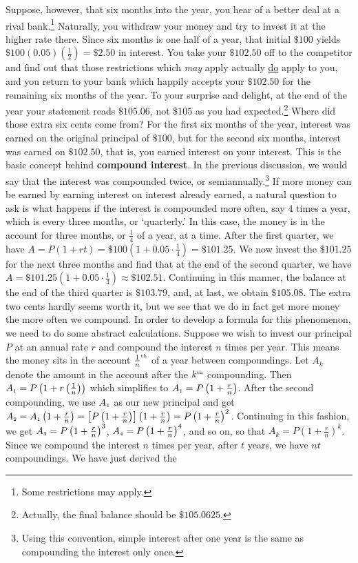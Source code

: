 Suppose, however, that six months into the year, you hear of a better deal at a rival bank.\footnote{Some restrictions may apply.} Naturally, you withdraw your money and try to invest it at the higher rate there.  Since six months is one half of a year, that initial $\$100$ yields $\$100(0.05)\left(\frac{1}{2}\right) = \$ 2.50$ in interest.  You take your $\$102.50$ off to the competitor and find out that those restrictions which \textit{may} apply actually \underline{do} apply to you, and you return to your bank which happily accepts your $\$102.50$ for the remaining six months of the year.  To your surprise and delight, at the end of the year your statement reads $\$105.06$, not $\$105$ as you had expected.\footnote{Actually, the final balance should be $\$105.0625$.}  Where did those extra six cents come from?  For the first six months of the year, interest was earned on the original principal of $\$100$, but for the second six months, interest was earned on $\$102.50$, that is, you earned interest on your interest.  This is the basic concept behind \textbf{compound interest}.  In the previous discussion, we would say that the interest was compounded twice, or semiannually.\footnote{Using this convention, simple interest after one year is the same as compounding the interest only once.}  If more money can be earned by earning interest on interest already earned, a natural question to ask is what happens if the interest is compounded more often, say $4$ times a year, which is every three months, or `quarterly.'  In this case, the money is in the account for three months, or $\frac{1}{4}$ of a year, at a time.  After the first quarter, we have $A = P(1+rt) =  \$100 \left(1 + 0.05 \cdot \frac{1}{4} \right) = \$101.25$.  We now invest the $\$101.25$ for the next three months and find that at the end of the second quarter, we have $A =  \$101.25 \left(1 + 0.05 \cdot \frac{1}{4} \right)\approx \$102.51$.  Continuing in this manner, the balance at the end of the third quarter is $\$103.79$, and, at last, we obtain $\$105.08$.  The extra two cents hardly seems worth it, but we see that we do in fact get more money the more often we compound.  In order to develop a formula for this phenomenon, we need to do some abstract calculations.  Suppose we wish to invest our principal $P$ at an annual rate $r$ and compound the interest $n$ times per year.  This means the money sits in the account $\frac{1}{n}^{\mbox{\tiny th}}$ of a year between compoundings.  Let $A_{k}$ denote the amount in the account after the $k^{\mbox{\tiny th}}$ compounding.  Then $A_{\mbox{\tiny$1$}} = P\left(1 + r\left(\frac{1}{n}\right)\right)$ which simplifies to $A_{\mbox{\tiny$1$}} = P \left(1 + \frac{r}{n}\right)$.  After the second compounding, we use $A_{\mbox{\tiny$1$}}$ as our new principal and get $A_{\mbox{\tiny$2$}} = A_{\mbox{\tiny$1$}} \left(1 + \frac{r}{n}\right) = \left[P \left(1 + \frac{r}{n}\right)\right]\left(1 + \frac{r}{n}\right) = P \left(1 + \frac{r}{n}\right)^2$.  Continuing in this fashion, we get $A_{\mbox{\tiny$3$}} =P \left(1 + \frac{r}{n}\right)^3$, $A_{\mbox{\tiny$4$}} =P \left(1 + \frac{r}{n}\right)^4$, and so on, so that $A_{k} = P \left(1 + \frac{r}{n}\right)^k$.  Since we compound the interest $n$ times per year, after $t$ years, we have $nt$ compoundings. We have just derived the 